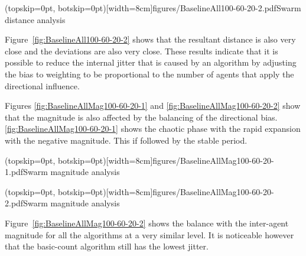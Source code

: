 \documentclass{ieeeaccess}
\begin{document}

\Figure[t!](topskip=0pt, botskip=0pt)[width=8cm]{figures/BaselineAll100-60-20-2.pdf}{Swarm distance analysis\label{fig:BaselineAll100-60-20-2}}

Figure~\ref{fig:BaselineAll100-60-20-2} shows that the resultant distance is also very close and the deviations are also very close. These results indicate that it is possible to reduce the internal jitter that is caused by an algorithm by adjusting the bias to weighting to be proportional to the number of agents that apply the directional influence.

Figures \ref{fig:BaselineAllMag100-60-20-1} and \ref{fig:BaselineAllMag100-60-20-2} show that the magnitude is also affected by the balancing of the directional bias. \ref{fig:BaselineAllMag100-60-20-1} shows the chaotic phase with the rapid expansion with the negative magnitude. This if followed by the stable period. 


\Figure[t!](topskip=0pt, botskip=0pt)[width=8cm]{figures/BaselineAllMag100-60-20-1.pdf}{Swarm magnitude analysis\label{fig:BaselineAllMag100-60-20-1}}


\Figure[t!](topskip=0pt, botskip=0pt)[width=8cm]{figures/BaselineAllMag100-60-20-2.pdf}{Swarm magnitude analysis\label{fig:BaselineAllMag100-60-20-2}}

Figure~\ref{fig:BaselineAllMag100-60-20-2} shows the balance with the inter-agent magnitude for all the algorithms at a very similar level. It is noticeable however that the basic-count algorithm still has the lowest jitter.
\end{document}
